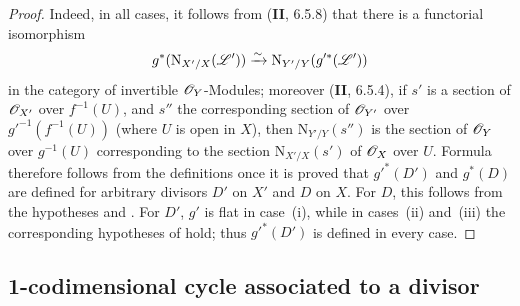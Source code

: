 \begin{proof}
Indeed, in all cases, it follows from (\textbf{II}, 6.5.8) that there is a functorial isomorphism
\[
  g^*(\mathrm{N}_{X'/X}(\mathscr{L}'))\xrightarrow{\sim}\mathrm{N}_{Y'/Y}(g'^*(\mathscr{L}'))
\]
in the category of invertible $\mathscr{O}_Y$-Modules;
moreover (\textbf{II}, 6.5.4), if $s'$ is a section of $\mathscr{O}_{X'}$ over $f^{-1}(U)$, and $s''$ the corresponding section of $\mathscr{O}_{Y'}$ over $g'^{-1}(f^{-1}(U))$ (where $U$ is open in $X$), then $\mathrm{N}_{Y'/Y}(s'')$ is the section of $\mathscr{O}_Y$ over $g^{-1}(U)$ corresponding to the section $\mathrm{N}_{X'/X}(s')$ of $\mathscr{O}_X$ over $U$.
Formula  therefore follows from the definitions once it is proved that $g'^*(D')$ and $g^*(D)$ are defined for arbitrary divisors $D'$ on $X'$ and $D$ on $X$.
For $D$, this follows from the hypotheses and .
For $D'$, $g'$ is flat in case~(i), while in cases~(ii) and~(iii) the corresponding hypotheses of  hold;
thus $g'^*(D')$ is defined in every case.
\end{proof}
\subsection{1-codimensional cycle associated to a divisor}
\label{subsection:IV.21.6}
\label{IV.21.6}


